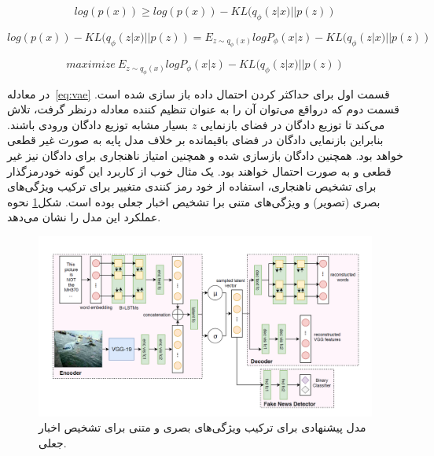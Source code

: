 \documentclass[12pt,a4paper]{report}
\theoremstyle{definition}
\theoremstyle{definition}
\begin{document}
\begin{equation}
log(p(x)) \ge log(p(x)) - KL(q_\phi(z|x) || p(z))
\end{equation}

\begin{equation}
log(p(x)) - KL(q_\phi(z|x) || p(z)) = E_{z \sim q_\phi(x)}logP_\phi(x|z)  -  KL(q_\phi(z|x) || p(z))
\end{equation}


\begin{equation}
maximize\  E_{z \sim q_\phi(x)}logP_\phi(x|z)  -  KL(q_\phi(z|x) || p(z))
\label{eq:vae}
\end{equation}

در معادله~\eqref{eq:vae} قسمت اول برای حداکثر کردن احتمال داده باز سازی شده است. قسمت دوم که درواقع می‌توان آن را به عنوان تنظیم کننده معادله درنظر گرفت، تلاش می‌کند تا توزیع دادگان در فضای بازنمایی $z$ بسیار مشابه توزیع دادگان ورودی باشند. بنابراین بازنمایی دادگان در فضای باقیمانده بر خلاف مدل پایه به صورت غیر قطعی خواهد بود. همچنین دادگان بازسازی شده و همچنین امتیاز ناهنجاری برای دادگان نیز غیر قطعی و به صورت احتمال خواهند بود. یک مثال خوب از کاربرد این گونه خودرمزگذار برای تشخیص ناهنجاری، استفاده از خود رمز کنندی متغییر برای ترکیب ویژگی‌های بصری (تصویر) و ویژگی‌های متنی برا تشخیص اخبار جعلی بوده است\cite{10.1145/3308558.3313552}. شکل\ref{fig:khattar} نحوه عملکرد این مدل را نشان می‌دهد.

\begin{figure}[!h]
	\begin{center}
		\includegraphics[width=1\linewidth]{./images/figures/khattar.png}
	\end{center}
	\caption{مدل پیشنهادی برای ترکیب ویژگی‌های بصری و متنی برای تشخیص اخبار جعلی\cite{10.1145/3308558.3313552}.}
	\label{fig:khattar}
	\centering
\end{figure}
\end{document}
